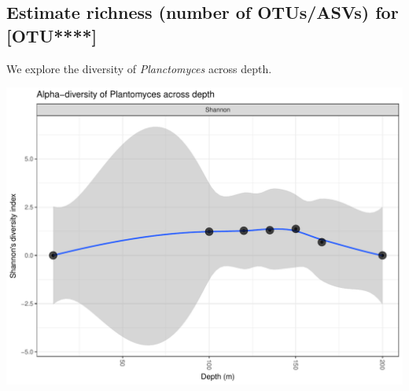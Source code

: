\documentclass[11 pt,]{article}
\newenvironment{Shaded}{\begin{snugshade}}{\end{snugshade}}
\newcommand{\KeywordTok}[1]{\textcolor[rgb]{0.13,0.29,0.53}{\textbf{#1}}}
\newcommand{\DataTypeTok}[1]{\textcolor[rgb]{0.13,0.29,0.53}{#1}}
\newcommand{\DecValTok}[1]{\textcolor[rgb]{0.00,0.00,0.81}{#1}}
\newcommand{\FloatTok}[1]{\textcolor[rgb]{0.00,0.00,0.81}{#1}}
\newcommand{\StringTok}[1]{\textcolor[rgb]{0.31,0.60,0.02}{#1}}
\newcommand{\OperatorTok}[1]{\textcolor[rgb]{0.81,0.36,0.00}{\textbf{#1}}}
\newcommand{\NormalTok}[1]{#1}
\begin{document}
\subsection{\texorpdfstring{Estimate richness (number of OTUs/ASVs) for
{[}OTU****{]}
\label{sec:richness}}{Estimate richness (number of OTUs/ASVs) for {[}OTU****{]} }}\label{estimate-richness-number-of-otusasvs-for-otu}

We explore the diversity of \emph{Planctomyces} across depth.

\begin{Shaded}
\end{Shaded}

\includegraphics{Figs/unnamed-chunk-14-1.pdf}
\end{document}
